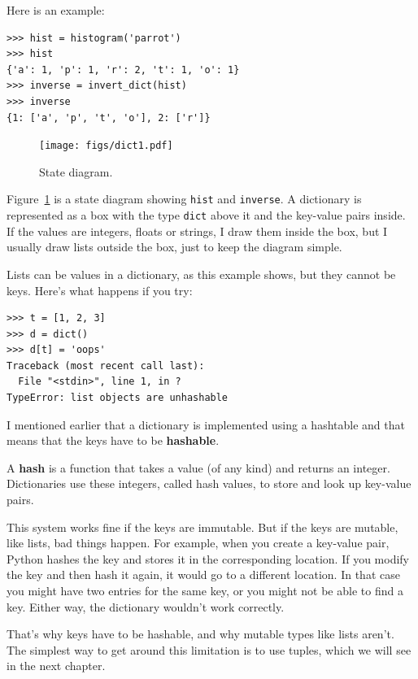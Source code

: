 \documentclass[10pt]{book}
\begin{document}
Here is an example:

\begin{verbatim}
>>> hist = histogram('parrot')
>>> hist
{'a': 1, 'p': 1, 'r': 2, 't': 1, 'o': 1}
>>> inverse = invert_dict(hist)
>>> inverse
{1: ['a', 'p', 't', 'o'], 2: ['r']}
\end{verbatim}

\begin{figure}
\centerline
{\texttt{[image: figs/dict1.pdf]}}
\caption{State diagram.}
\label{fig.dict1}
\end{figure}

Figure~\ref{fig.dict1} is a state diagram showing {\tt hist} and {\tt inverse}.
A dictionary is represented as a box with the type {\tt dict} above it
and the key-value pairs inside.  If the values are integers, floats or
strings, I draw them inside the box, but I usually draw lists
outside the box, just to keep the diagram simple.

Lists can be values in a dictionary, as this example shows, but they
cannot be keys.  Here's what happens if you try:


\begin{verbatim}
>>> t = [1, 2, 3]
>>> d = dict()
>>> d[t] = 'oops'
Traceback (most recent call last):
  File "<stdin>", line 1, in ?
TypeError: list objects are unhashable
\end{verbatim}
%
I mentioned earlier that a dictionary is implemented using
a hashtable and that means that the keys have to be {\bf hashable}.

A {\bf hash} is a function that takes a value (of any kind)
and returns an integer.  Dictionaries use these integers,
called hash values, to store and look up key-value pairs.

This system works fine if the keys are immutable.  But if the
keys are mutable, like lists, bad things happen.  For example,
when you create a key-value pair, Python hashes the key and
stores it in the corresponding location.  If you modify the
key and then hash it again, it would go to a different location.
In that case you might have two entries for the same key,
or you might not be able to find a key.  Either way, the
dictionary wouldn't work correctly.

That's why keys have to be hashable, and why mutable types like
lists aren't.  The simplest way to get around this limitation is to
use tuples, which we will see in the next chapter.
\end{document}
